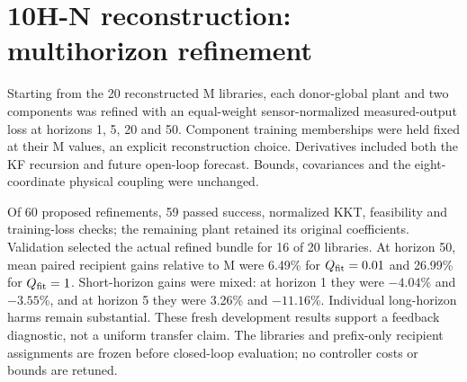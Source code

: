 \section{10H-N reconstruction: multihorizon refinement}
Starting from the 20 reconstructed M libraries, each donor-global plant and
two components was refined with an equal-weight sensor-normalized measured-output
loss at horizons 1, 5, 20 and 50. Component training memberships were held fixed
at their M values, an explicit reconstruction choice. Derivatives included both
the KF recursion and future open-loop forecast. Bounds, covariances and the
eight-coordinate physical coupling were unchanged.

Of 60 proposed refinements, 59 passed success, normalized KKT, feasibility and
training-loss checks; the remaining plant retained its original coefficients.
Validation selected the actual refined bundle for 16 of 20 libraries. At horizon
50, mean paired recipient gains relative to M were 6.49\% for
$Q_{\rm fit}=0.01$ and 26.99\% for $Q_{\rm fit}=1$. Short-horizon gains were mixed:
at horizon 1 they were $-4.04\%$ and $-3.55\%$, and at horizon 5 they were
3.26\% and $-11.16\%$. Individual long-horizon harms remain substantial. These
fresh development results support a feedback diagnostic, not a uniform transfer
claim. The libraries and prefix-only recipient assignments are frozen before
closed-loop evaluation; no controller costs or bounds are retuned.
